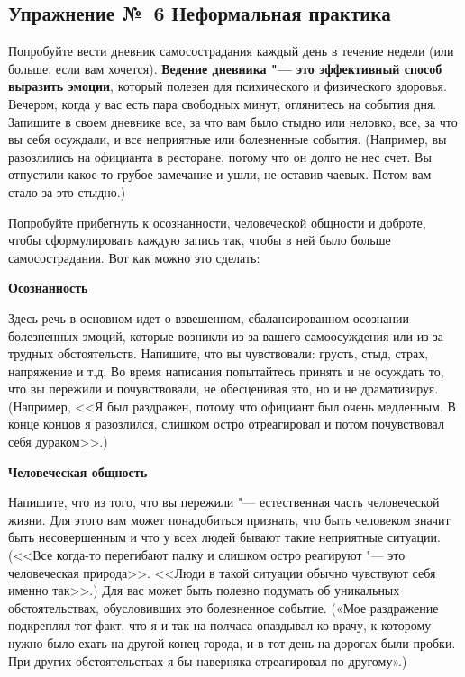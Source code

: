 \subsection{Упражнение №~6 Неформальная практика}


\vspace{3ex}

Попробуйте вести дневник самосострадания каждый день в течение недели (или больше, если вам хочется). \textbf{Ведение дневника "--- это эффективный способ выразить эмоции}, который полезен для психического и физического здоровья.
Вечером, когда у вас есть пара свободных минут, оглянитесь на события дня. Запишите в своем дневнике все, за что вам было стыдно или неловко, все, за что вы себя осуждали, и все неприятные или болезненные события. (Например, вы разозлились на официанта в ресторане, потому что он долго не нес счет. Вы отпустили какое-то грубое замечание и ушли, не оставив чаевых. Потом вам стало за это стыдно.)

Попробуйте прибегнуть к осознанности, человеческой общности и доброте, чтобы сформулировать каждую запись так, чтобы в ней было больше самосострадания. Вот как можно это сделать:
\vspace{3ex}

\textbf{Осознанность}

Здесь речь в основном идет о взвешенном, сбалансированном осознании болезненных эмоций, которые возникли из-за вашего самоосуждения или из-за трудных обстоятельств. Напишите, что вы чувствовали: грусть, стыд, страх, напряжение и т.д. Во время написания попытайтесь принять и не осуждать то, что вы пережили и почувствовали, не обесценивая это, но и не драматизируя. (Например, <<Я был раздражен, потому что официант был очень медленным. В конце концов я разозлился, слишком остро отреагировал и потом почувствовал себя дураком>>.) 
\vspace{3ex}

\textbf{Человеческая общность}

Напишите, что из того, что вы пережили "--- естественная часть человеческой жизни. Для этого вам может понадобиться признать, что быть человеком значит быть несовершенным и что у всех людей бывают такие неприятные ситуации. (<<Все когда-то перегибают палку и слишком остро реагируют "--- это человеческая природа>>. <<Люди в такой ситуации обычно чувствуют себя именно так>>.) Для вас может быть полезно подумать об уникальных обстоятельствах, обусловивших это болезненное событие. («Мое раздражение подкреплял тот факт, что я и так на полчаса опаздывал ко врачу, к которому нужно было ехать на другой конец города, и в тот день на дорогах были пробки. При других обстоятельствах я бы наверняка отреагировал по-другому».) 
\vspace{3ex}

